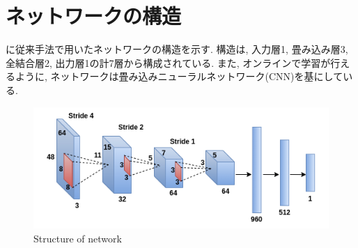   \newpage
\section{ネットワークの構造}
に従来手法で用いたネットワークの構造を示す. 構造は, 入力層1, 畳み込み層3, 全結合層2, 出力層1の計7層から構成されている. また, オンラインで学習が行えるように, ネットワークは畳み込みニューラルネットワーク(CNN)を基にしている. 

\vspace{10mm}
\begin{figure}[h]
  \centering
  \includegraphics[keepaspectratio, scale=0.6]{images/cnn.png}
  \caption{Structure of network}
  \label{Fig:cnn}
  \end{figure}


